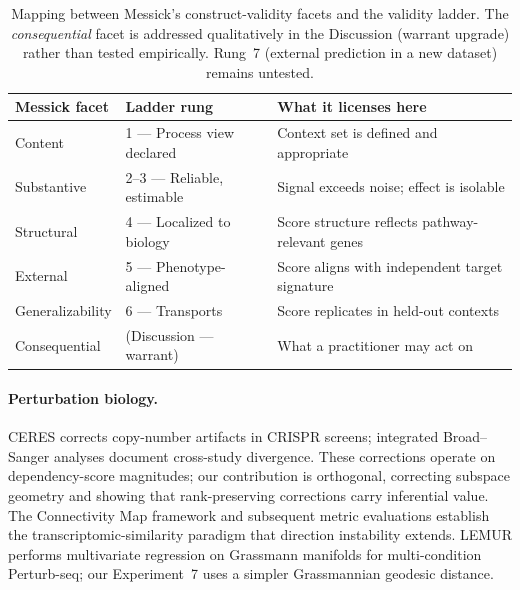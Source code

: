 \documentclass[11pt]{article}
\begin{document}
\begin{table}[t]
\centering
\caption{Mapping between Messick's construct-validity facets and
the validity ladder.
The \emph{consequential} facet is addressed qualitatively in the
Discussion (warrant upgrade) rather than tested empirically.
Rung~7 (external prediction in a new dataset) remains untested.}
\label{tab:messick}
\small
\begin{tabular}{lll}
\toprule
Messick facet & Ladder rung & What it licenses here \\
\midrule
Content & 1 --- Process view declared & Context set is defined and appropriate \\
Substantive & 2--3 --- Reliable, estimable & Signal exceeds noise; effect is isolable \\
Structural & 4 --- Localized to biology & Score structure reflects pathway-relevant genes \\
External & 5 --- Phenotype-aligned & Score aligns with independent target signature \\
Generalizability & 6 --- Transports & Score replicates in held-out contexts \\
Consequential & (Discussion --- warrant) & What a practitioner may act on \\
\bottomrule
\end{tabular}
\end{table}

\paragraph{Perturbation biology.}
CERES \citep{meyers2017ceres} corrects copy-number artifacts in CRISPR
screens; integrated Broad--Sanger analyses \citep{pacini2021integrated}
document cross-study divergence. These corrections operate on
dependency-score magnitudes; our contribution is orthogonal, correcting
subspace geometry and showing that rank-preserving corrections carry
inferential value. The Connectivity Map framework
\citep{subramanian2017next,lamb2006connectivity} and subsequent metric
evaluations \citep{li2020comprehensive} establish the
transcriptomic-similarity paradigm that direction instability extends.
LEMUR \citep{ahlmanneltze2025lemur} performs multivariate regression on
Grassmann manifolds for multi-condition Perturb-seq; our Experiment~7 uses
a simpler Grassmannian geodesic distance.
\end{document}
